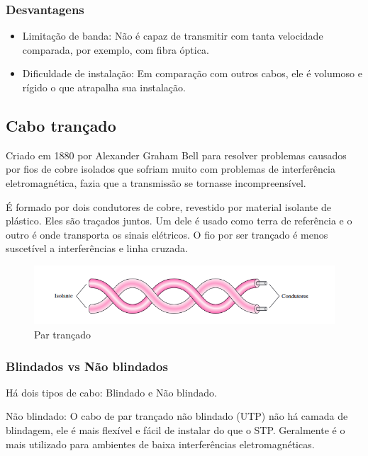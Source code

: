 \documentclass[12pt,a4, oneside, brazil]{article}
\begin{document}
	\subsubsection{Desvantagens}
	\begin{itemize}
		\item Limitação de banda: Não é capaz de transmitir com tanta velocidade comparada, por exemplo, com fibra óptica.
		\item Dificuldade de instalação: Em comparação com outros cabos, ele é volumoso e rígido o que atrapalha sua instalação.
		
	\end{itemize}
	
	\subsection{Cabo trançado}
	Criado em 1880 por Alexander Graham Bell para resolver problemas causados por fios de cobre isolados que sofriam muito com problemas de interferência eletromagnética, fazia que a transmissão se tornasse incompreensível.
	
	É formado por dois condutores de cobre, revestido por material isolante de plástico. Eles são traçados juntos. Um dele é usado como terra de referência e o outro é onde transporta os sinais elétricos. O fio por ser trançado é menos suscetível a interferências e linha cruzada. 
	
\begin{figure}[H]
	\centering
	\includegraphics[width=15cm]{par-trançado}
	\caption{Par trançado}
	\label{fig:par-trancado}
\end{figure}
	
	\subsubsection{Blindados vs Não blindados}
	Há dois tipos de cabo: Blindado e Não blindado.
	
	Não blindado:  O cabo de par trançado não blindado (UTP) não há camada de blindagem, ele é mais flexível e fácil de instalar do que o STP. Geralmente é o mais utilizado para ambientes de baixa interferências eletromagnéticas.
	
\end{document}
